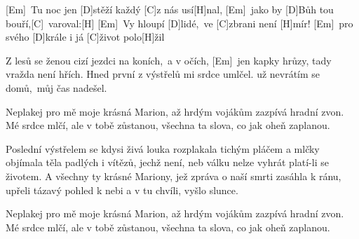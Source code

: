 [Em]\ Tu noc jen [D]stěží každý [C]z nás usí[H]nal,
[Em]\ jako by [D]Bůh tou bouří,[C]\ varoval:[H]
[Em]\ Vy hloupí [D]lidé,\ ve [C]zbrani není [H]mír!
[Em]\ pro svého [D]krále i já [C]život polo[H]žil

Z lesů se ženou cizí jezdci na koních,\ a v očích,
[Em]\ jen kapky hrůzy, tady vražda není hřích.
Hned první z výstřelů mi srdce umlčel.
už nevrátím se domů,\ můj čas nadešel.

Neplakej pro mě moje krásná Marion,
až hrdým vojákům zazpívá hradní zvon.
Mé srdce mlčí, ale v tobě zůstanou,
všechna ta slova, co jak oheň zaplanou.

Poslední výstřelem se kdysi živá louka rozplakala tichým pláčem
a mlčky objímala těla padlých i vítězů, jechž není, neb válku nelze vyhrát platí-li se životem.
A všechny ty krásné Mariony, jež zpráva o naší smrti zasáhla k ránu,
upřeli tázavý pohled k nebi a v tu chvíli, vyšlo slunce.

Neplakej pro mě moje krásná Marion,
až hrdým vojákům zazpívá hradní zvon.
Mé srdce mlčí, ale v tobě zůstanou,
všechna ta slova, co jak oheň zaplanou.
